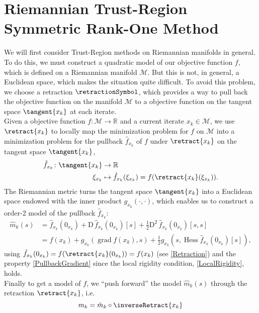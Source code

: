 \section{Riemannian Trust-Region Symmetric Rank-One Method}

We will first consider Trust-Region methods on Riemannian manifolds in general. To do this, we must construct a quadratic model of our objective function $f$, which is defined on a Riemannian manifold $\mathcal{M}$. But this is not, in general, a Euclidean space, which makes the situation quite difficult. To avoid this problem, we choose a retraction $\retractionSymbol$, which provides a way to pull back the objective function on the manifold $\mathcal{M}$ to a objective function on the tangent space $\tangent{x_k}$ at each iterate. \\
Given a objective function $f \colon \mathcal{M} \to \mathbb{R}$ and a current iterate $x_k \in \mathcal{M}$, we use $\retract{x_k}$ to locally map the minimization problem for $f$ on $\mathcal{M}$ into a minimization problem for the pullback $\hat{f}_{x_k}$ of $f$ under $\retract{x_k}$ on the tangent space $\tangent{x_k}$,
\begin{align*}
    \hat{f}_{x_k} \colon \tangent{x_k} & \to \mathbb{R} \\
    \xi_{x_k} & \mapsto \hat{f}_{x_k} (\xi_{x_k}) = f(\retract{x_k}(\xi_{x_k})).
\end{align*}
The Riemannian metric turns the tangent space $\tangent{x_k}$ into a Euclidean space endowed with the inner product $g_{x_k}(\cdot, \cdot)$, which enables us to construct a order-2 model of the pullback $\hat{f}_{x_k}$:
\begin{align*}
    \hat{m}_k( s ) & = \hat{f}_{x_k}(0_{x_k}) + \mathrm{D} \, \hat{f}_{x_k}(0_{x_k}) [s] + \frac{1}{2} \mathrm{D}^2 \, \hat{f}_{x_k}(0_{x_k}) [s, s] \\
    & = f(x_k) + g_{x_k}(\operatorname{grad} f(x_k), s ) + \frac{1}{2} g_{x_k}( s, \operatorname{Hess} \hat{f}_{x_k}(0_{x_k}) [s]),
\end{align*}
using $\hat{f}_{x_k}(0_{x_k}) = f(\retract{x_k}(0_{x_k})) = f(x_k)$ (see \cref{Retraction}) and the property \cref{PullbackGradient} since the local rigidity condition, \cref{LocalRigidity}, holds. \\
Finally to get a model of $f$, we “push forward” the model $\hat{m}_k(s)$ through the retraction $\retract{x_k}$, i.e.
\begin{equation}\label{RiemannianModel}
    m_k = \hat{m}_k \circ \inverseRetract{x_k}
\end{equation}
